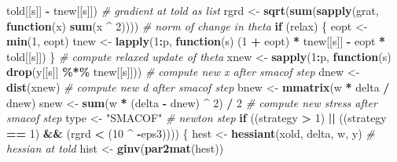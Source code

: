 \documentclass[
  12pt,
]{article}
\newenvironment{Shaded}{\begin{snugshade}}{\end{snugshade}}
\newcommand{\CommentTok}[1]{\textcolor[rgb]{0.56,0.35,0.01}{\textit{#1}}}
\newcommand{\ControlFlowTok}[1]{\textcolor[rgb]{0.13,0.29,0.53}{\textbf{#1}}}
\newcommand{\DecValTok}[1]{\textcolor[rgb]{0.00,0.00,0.81}{#1}}
\newcommand{\FunctionTok}[1]{\textcolor[rgb]{0.13,0.29,0.53}{\textbf{#1}}}
\newcommand{\NormalTok}[1]{#1}
\newcommand{\OtherTok}[1]{\textcolor[rgb]{0.56,0.35,0.01}{#1}}
\newcommand{\SpecialCharTok}[1]{\textcolor[rgb]{0.81,0.36,0.00}{\textbf{#1}}}
\newcommand{\StringTok}[1]{\textcolor[rgb]{0.31,0.60,0.02}{#1}}
\begin{document}
\begin{Shaded}
\begin{Highlighting}[]
\NormalTok{          told[[s]] }\SpecialCharTok{{-}}\NormalTok{ tnew[[s]]) }\CommentTok{\# gradient at told as list}
\NormalTok{      rgrd }\OtherTok{\textless{}{-}}
        \FunctionTok{sqrt}\NormalTok{(}\FunctionTok{sum}\NormalTok{(}\FunctionTok{sapply}\NormalTok{(grat, }\ControlFlowTok{function}\NormalTok{(x)}
          \FunctionTok{sum}\NormalTok{(x }\SpecialCharTok{\^{}} \DecValTok{2}\NormalTok{)))) }\CommentTok{\# norm of change in theta}
      \ControlFlowTok{if}\NormalTok{ (relax) \{}
\NormalTok{        eopt }\OtherTok{\textless{}{-}} \FunctionTok{min}\NormalTok{(}\DecValTok{1}\NormalTok{, eopt)}
\NormalTok{        tnew }\OtherTok{\textless{}{-}} \FunctionTok{lapply}\NormalTok{(}\DecValTok{1}\SpecialCharTok{:}\NormalTok{p, }\ControlFlowTok{function}\NormalTok{(s)}
\NormalTok{          (}\DecValTok{1} \SpecialCharTok{+}\NormalTok{ eopt) }\SpecialCharTok{*}\NormalTok{ tnew[[s]] }\SpecialCharTok{{-}}\NormalTok{ eopt }\SpecialCharTok{*}\NormalTok{ told[[s]])}
\NormalTok{      \} }\CommentTok{\# compute relaxed update of theta}
\NormalTok{      xnew }\OtherTok{\textless{}{-}} \FunctionTok{sapply}\NormalTok{(}\DecValTok{1}\SpecialCharTok{:}\NormalTok{p, }\ControlFlowTok{function}\NormalTok{(s)}
        \FunctionTok{drop}\NormalTok{(y[[s]] }\SpecialCharTok{\%*\%}\NormalTok{ tnew[[s]])) }\CommentTok{\# compute new x after smacof step}
\NormalTok{      dnew }\OtherTok{\textless{}{-}}
        \FunctionTok{dist}\NormalTok{(xnew) }\CommentTok{\# compute new d after smacof step}
\NormalTok{      bnew }\OtherTok{\textless{}{-}} \FunctionTok{mmatrix}\NormalTok{(w }\SpecialCharTok{*}\NormalTok{ delta }\SpecialCharTok{/}\NormalTok{ dnew)}
\NormalTok{      snew }\OtherTok{\textless{}{-}}
        \FunctionTok{sum}\NormalTok{(w }\SpecialCharTok{*}\NormalTok{ (delta }\SpecialCharTok{{-}}\NormalTok{ dnew) }\SpecialCharTok{\^{}} \DecValTok{2}\NormalTok{) }\SpecialCharTok{/} \DecValTok{2} \CommentTok{\# compute new stress after smacof step}
\NormalTok{      type }\OtherTok{\textless{}{-}} \StringTok{"SMACOF"}
      \CommentTok{\# newton step}
      \ControlFlowTok{if}\NormalTok{ ((strategy }\SpecialCharTok{\textgreater{}} \DecValTok{1}\NormalTok{) }\SpecialCharTok{||}\NormalTok{ ((strategy }\SpecialCharTok{==} \DecValTok{1}\NormalTok{) }\SpecialCharTok{\&\&}\NormalTok{ (rgrd }\SpecialCharTok{\textless{}}\NormalTok{ (}\DecValTok{10} \SpecialCharTok{\^{}} \SpecialCharTok{{-}}\NormalTok{eps3)))) \{}
\NormalTok{        hest }\OtherTok{\textless{}{-}}
          \FunctionTok{hessiant}\NormalTok{(xold, delta, w, y) }\CommentTok{\# hessian at told}
\NormalTok{        hist }\OtherTok{\textless{}{-}} \FunctionTok{ginv}\NormalTok{(}\FunctionTok{par2mat}\NormalTok{(hest))}

\end{Highlighting}
\end{Shaded}
\end{document}
